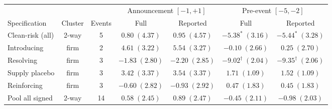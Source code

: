 \begin{tabular}{l c c c c c c}
\toprule
 & & & \multicolumn{2}{c}{Announcement $[-1,+1]$} & \multicolumn{2}{c}{Pre-event $[-5,-2]$} \\
\cmidrule(lr){4-5}\cmidrule(lr){6-7}
Specification & Cluster & Events & Full & Reported & Full & Reported \\
\midrule
Clean-risk (all) & 2-way & 5 & $0.80\;(4.37)$ & $0.95\;(4.57)$ & $-5.38^{*}\;(3.16)$ & $-5.44^{*}\;(3.28)$ \\
\quad Introducing & firm & 2 & $4.61\;(3.22)$ & $5.54\;(3.27)$ & $-0.10\;(2.66)$ & $0.25\;(2.70)$ \\
\quad Resolving & firm & 3 & $-1.83\;(2.80)$ & $-2.20\;(2.85)$ & $-9.02^{\dagger}\;(2.04)$ & $-9.35^{\dagger}\;(2.06)$ \\
Supply placebo & firm & 3 & $3.42\;(3.37)$ & $3.54\;(3.37)$ & $1.71\;(1.09)$ & $1.52\;(1.09)$ \\
Reinforcing & firm & 3 & $-0.60\;(2.82)$ & $-0.93\;(2.92)$ & $0.47\;(1.83)$ & $0.45\;(1.83)$ \\
Pool all signed & 2-way & 14 & $0.58\;(2.45)$ & $0.89\;(2.47)$ & $-0.45\;(2.11)$ & $-0.98\;(2.03)$ \\
\bottomrule
\end{tabular}
